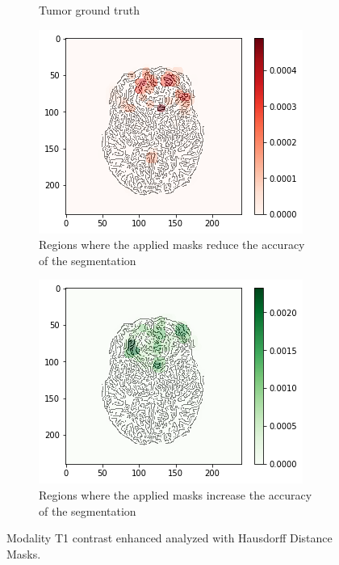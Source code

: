 \begin{figure}[H]
\begin{subfigure}[t]{.4\textwidth}
        \caption{Tumor ground truth}
    \end{subfigure}
    \begin{subfigure}[t]{.45\textwidth}
        \centering
        \includegraphics[width=\linewidth]{chapters/06_hdm/c_Brats18_2013_17_1_L1/48.png}
        \caption{Regions where the applied masks reduce the accuracy of the segmentation}
    \end{subfigure}\hspace{1cm}%
    \begin{subfigure}[t]{.45\textwidth}
        \centering
        \includegraphics[width=\linewidth]{chapters/06_hdm/c_Brats18_2013_17_1_L1/49.png}
        \caption{Regions where the applied masks increase the accuracy of the segmentation}
    \end{subfigure}
    \caption{Modality T1 contrast enhanced analyzed with Hausdorff Distance Masks.}
    \label{brats_201317_t1ce}
\end{figure}

